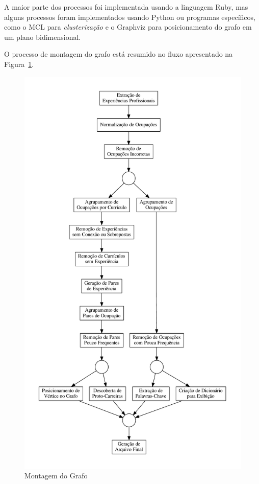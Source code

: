 \documentclass[12pt,a4paper]{article}
\begin{document}
A maior parte dos processos foi implementada usando a linguagem Ruby, mas alguns processos foram implementados usando Python ou programas específicos, como o MCL para \textit{clusterização} e o Graphviz para posicionamento do grafo em um plano bidimensional.

O processo de montagem do grafo está resumido no fluxo apresentado na Figura~\ref{fig:montagem-do-grafo}.

\begin{figure}[ht]
  \centering
  \includegraphics[scale=0.4]{pipeline1.pdf}
  \caption{Montagem do Grafo}
  \label{fig:montagem-do-grafo}
\end{figure}
\end{document}

